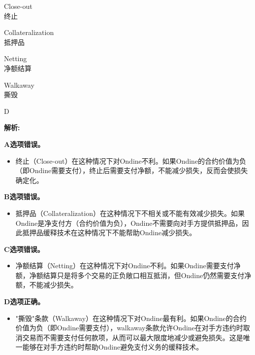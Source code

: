 \documentclass{article}
\newenvironment{explanation}
{\textbf{解析:}\par}
{\par}
\begin{document}
\begin{choices}
    \item Close-out\\
    终止
    \item Collateralization\\
    抵押品
    \item Netting\\
    净额结算
    \item Walkaway\\
    撕毁
\end{choices}

\begin{correctanswer}
    D
\end{correctanswer}

\begin{explanation}

    \textbf{A选项错误。}
    \begin{itemize}
        \item 终止（Close-out）在这种情况下对Ondine不利。如果Ondine的合约价值为负（即Ondine需要支付），终止后需要支付净额，不能减少损失，反而会使损失确定化。
    \end{itemize}

    \textbf{B选项错误。}
    \begin{itemize}
        \item 抵押品（Collateralization）在这种情况下不相关或不能有效减少损失。如果Ondine是净支付方（合约价值为负），Ondine不需要向对手方提供抵押品，因此抵押品缓释技术在这种情况下不能帮助Ondine减少损失。
    \end{itemize}

    \textbf{C选项错误。}
    \begin{itemize}
        \item 净额结算（Netting）在这种情况下对Ondine不利。如果Ondine需要支付净额，净额结算只是将多个交易的正负敞口相互抵消，但Ondine仍然需要支付净额，不能减少损失。
    \end{itemize}

    \textbf{D选项正确。}
    \begin{itemize}
        \item "撕毁"条款（Walkaway）在这种情况下对Ondine最有利。如果Ondine的合约价值为负（即Ondine需要支付），walkaway条款允许Ondine在对手方违约时取消交易而不需要支付任何款项，从而可以最大限度地减少或避免损失。这是唯一能够在对手方违约时帮助Ondine避免支付义务的缓释技术。
    \end{itemize}

\end{explanation}
\end{document}
